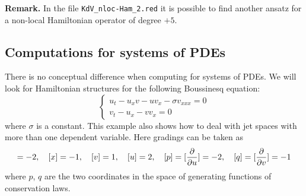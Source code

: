 \documentclass[12pt]{amsart}
\theoremstyle{definition}
\newcommand*{\pd}[2]{\mathchoice{\frac{\partial#1}{\partial#2}}
  {\partial#1/\partial#2}{\partial#1/\partial#2}
  {\partial#1/\partial#2}}
\begin{document}
\textbf{Remark.} In the file \texttt{KdV\_nloc-Ham\_2.red} it is possible to
find another ansatz for a non-local Hamiltonian operator of degree $+5$.

\subsection{Computations for systems of PDEs}
\label{sec:comp-syst-pdes}

There is no conceptual difference when computing for systems of PDEs. We will
look for Hamiltonian structures for the following Boussinesq equation:
\begin{equation}
  \label{eq:1}
  \left\{
  \begin{array}{l}
  u_t-u_xv-uv_x-\sigma v_{xxx}=0\\
  v_t-u_x-vv_x=0
\end{array}
\right.
\end{equation}
where $\sigma$ is a constant. This example also shows how to deal with jet
spaces with more than one dependent variable. Here gradings can be taken as
\begin{displaymath}
  [t]=-2,\quad [x]=-1,\quad [v]=1,\quad [u]=2,\quad [p]=[\pd{}{u}]=-2,\quad
  [q]=[\pd{}{v}]=-1
\end{displaymath}
where $p$, $q$ are the two coordinates in the space of generating functions of
conservation laws.
\end{document}
